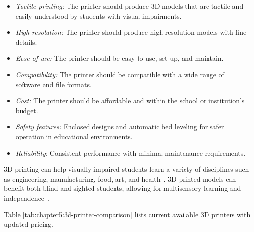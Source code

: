 \begin{itemize}
    \item \emph{Tactile printing:} The printer should produce 3D models that are tactile and easily understood by students with visual impairments.
    \item \emph{High resolution:} The printer should produce high-resolution models with fine details.
    \item \emph{Ease of use:} The printer should be easy to use, set up, and maintain.
    \item \emph{Compatibility:} The printer should be compatible with a wide range of software and file formats.
    \item \emph{Cost:} The printer should be affordable and within the school or institution's budget.
    \item \emph{Safety features:} Enclosed designs and automatic bed leveling for safer operation in educational environments.
    \item \emph{Reliability:} Consistent performance with minimal maintenance requirements.
\end{itemize}

3D printing can help visually impaired students learn a variety of disciplines such as engineering, manufacturing, food, art, and health~\cite{Karbowski2020}. 3D printed models can benefit both blind and sighted students, allowing for multisensory learning and independence~\cite{MatterHackers2017}.

Table \ref{tab:chapter5:3d-printer-comparison} lists current available 3D printers with updated pricing.

